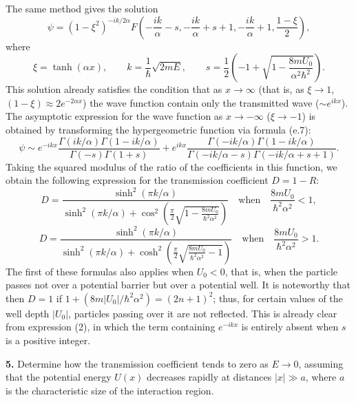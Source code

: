 The same method gives the solution
\begin{equation}
  \psi=(1-\xi^2)^{-ik/2\alpha}
  F\left(-\frac{ik}{\alpha}-s,-\frac{ik}{\alpha}+s+1,
  -\frac{ik}{\alpha}+1,\frac{1-\xi}{2}\right),
  \tag{1}
\end{equation}
where
\[
  \xi=\tanh(\alpha x),\qquad
  k=\frac{1}{\hbar}\sqrt{2mE},\qquad
  s=\frac12\left(-1+\sqrt{1-\frac{8mU_0}{\alpha^2\hbar^2}}\right).
\]
This solution already satisfies the condition that as $x\to\infty$ (that
is, as $\xi\to1$, $(1-\xi)\approx2e^{-2\alpha x}$) the wave function
contain only the transmitted wave ($\sim e^{ikx}$). The asymptotic expression for
the wave function as $x\to-\infty$ ($\xi\to-1$) is obtained by transforming
the hypergeometric function via formula (e.7):
\begin{equation}
  \psi\sim e^{-ikx}\frac{\Gamma(ik/\alpha)\Gamma(1-ik/\alpha)}
  {\Gamma(-s)\Gamma(1+s)}
  +e^{ikx}\frac{\Gamma(-ik/\alpha)\Gamma(1-ik/\alpha)}
  {\Gamma(-ik/\alpha-s)\Gamma(-ik/\alpha+s+1)}.
  \tag{2}
\end{equation}
Taking the squared modulus of the ratio of the coefficients in this
function, we obtain the following expression for the transmission
coefficient $D=1-R$:
\[
  D=\frac{\sinh^2(\pi k/\alpha)}
  {\sinh^2(\pi k/\alpha)+
   \cos^2\left(\frac{\pi}{2}
   \sqrt{1-\frac{8mU_0}{\hbar^2\alpha^2}}\right)}
  \quad\text{when}\quad \frac{8mU_0}{\hbar^2\alpha^2}<1,
\]
\[
  D=\frac{\sinh^2(\pi k/\alpha)}
  {\sinh^2(\pi k/\alpha)+
   \cosh^2\left(\frac{\pi}{2}
   \sqrt{\frac{8mU_0}{\hbar^2\alpha^2}-1}\right)}
  \quad\text{when}\quad \frac{8mU_0}{\hbar^2\alpha^2}>1.
\]
The first of these formulas also applies when $U_0<0$, that is, when the
particle passes not over a potential barrier but over a potential well. It
is noteworthy that then $D=1$ if
$1+(8m|U_0|/\hbar^2\alpha^2)=(2n+1)^2$; thus, for certain values of the well
depth $|U_0|$, particles passing over it are not reflected. This is already
clear from expression (2), in which the term containing $e^{-ikx}$ is
entirely absent when $s$ is a positive integer.

\ProblemHeading
\textbf{5.} Determine how the transmission coefficient tends to zero as
$E\to0$, assuming that the potential energy $U(x)$ decreases rapidly at
distances $|x|\gg a$, where $a$ is the characteristic size of the
interaction region.

